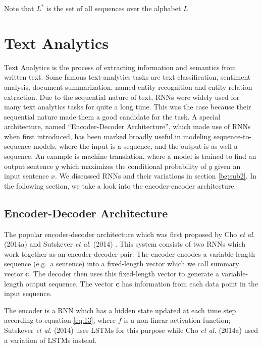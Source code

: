 Note that $L^*$ is the set of all sequences over the alphabet $L$




\section{Text Analytics} \label{bg:s4}

Text Analytics is the process of extracting information and semantics from written text. Some famous text-analytics tasks are text classification, sentiment analysis, document summarization, named-entity recognition and entity-relation extraction. Due to the sequential nature of text, \ac{RNN}s were widely used for many text analytics tasks for quite a long time. This was the case because their sequential nature made them a good candidate for the task. A special architecture, named \enquote{Encoder-Decoder Architecture}, which made use of \ac{RNN}s when first introduced, has been marked broadly useful in modeling sequence-to-sequence models, where the input is a sequence, and the output is as well a sequence. An example is machine translation, where a model is trained to find an output sentence $y$ which maximizes the conditional probability of $y$ given an input sentence $x$. We discussed \ac{RNN}s and their variations in section \ref{bg:sub2}. In the following section, we take a look into the encoder-encoder architecture.

\subsection{Encoder-Decoder Architecture} 
\label{bg:sub8}

The popular encoder-decoder architecture which was first proposed by Cho \textit{et al.} (2014a) \cite{cho2014learning} and Sutskever \textit{et al.} (2014) \cite{sutskever2014sequence}. This system consists of two \ac{RNNs} which work together as an encoder-decoder pair. The encoder encodes a variable-length sequence (e.g.\ a sentence) into a fixed-length vector which we call summary vector $ \mathbf{c} $. The decoder then uses this fixed-length vector to generate a variable-length output sequence. The vector $ \mathbf{c} $ has information from each data point in the input sequence.

The encoder is a \ac{RNN} which has a hidden state updated at each time step according to equation \ref{eq:13}, where $f$ is a non-linear activation function;  Sutskever \textit{et al.} (2014) \cite{sutskever2014sequence} uses \ac{LSTM}s for this purpose while Cho \textit{et al.} (2014a) \cite{cho2014learning} used a variation of \ac{LSTM}s instead.

